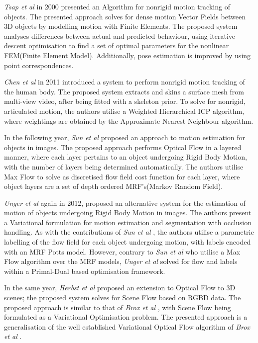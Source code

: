 \textit{Tsap et al} \cite{Tsap2000} in 2000 presented an Algorithm for nonrigid motion 
tracking of objects. The presented approach solves for dense motion Vector Fields between 
3D objects by modelling motion with Finite Elements. The proposed system analyses differences 
between actual and predicted behaviour, using iterative descent optimisation to find a set of 
optimal parameters for the nonlinear FEM(Finite Element Model). Additionally, pose estimation 
is improved by using point correspondences.

\textit{Chen et al} \cite{Chen2011} in 2011 introduced a system to perform nonrigid motion 
tracking of the human body. The proposed system extracts and skins a surface mesh from 
multi-view video, after being fitted with a skeleton prior. To solve for nonrigid, articulated 
motion, the authors utilise a Weighted Hierarchical ICP algorithm, where weightings are obtained 
by the Approximate Nearest Neighbour \cite{ANN} algorithm.

In the following year, \textit{Sun et al} \cite{Sun2012} proposed an approach to motion estimation 
for objects in images. The proposed approach performs Optical Flow in a layered manner, where each 
layer pertains to an object undergoing Rigid Body Motion, with the number of layers being determined 
automatically. The authors utilise Max Flow \cite{MAXFLOW} to solve as discretised flow field cost 
function for each layer, where object layers are a set of depth ordered MRF's(Markov Random Field).

\textit{Unger et al} \cite{Unger2012} again in 2012, proposed an alternative system for the 
estimation of motion of objects undergoing Rigid Body Motion in images. The authors present a 
Variational formulation for motion estimation and segmentation with occlusion handling. As with 
the contributions of \textit{Sun et al} \cite{Sun2012}, the authors utilise a parametric labelling 
of the flow field for each object undergoing motion, with labels encoded with an MRF Potts model.
However, contrary to \textit{Sun et al} \cite{Sun2012} who utilise a Max Flow algorithm over the 
MRF models, \textit{Unger et al} solved for flow and labels within a Primal-Dual based optimisation 
framework.

In the same year, \textit{Herbst et al} \cite{Herbst2013} proposed an extension to Optical 
Flow to 3D scenes; the proposed system solves for Scene Flow based on RGBD data. The proposed 
approach is similar to that of \textit{Brox et al} \cite{Brox2004}, with Scene Flow being 
formulated as a Variational Optimisation problem. The presented approach is a generalisation 
of the well established Variational Optical Flow algorithm of \textit{Brox et al} \cite{Brox2004}.


